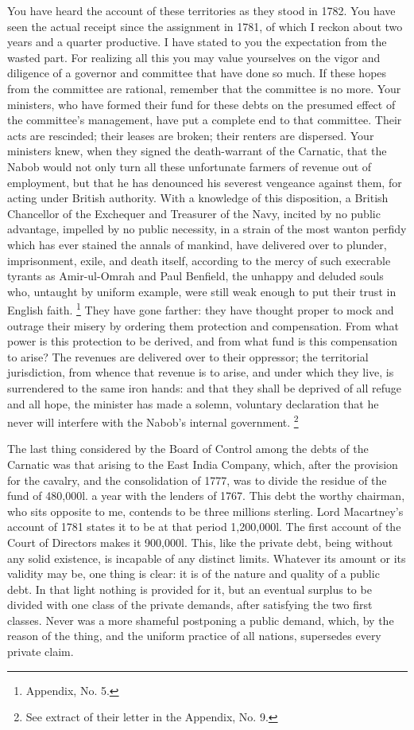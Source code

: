 You have heard the account of these territories as they stood in 1782. You have seen the actual receipt since the assignment in 1781, of which I reckon about two years and a quarter productive. I have stated to you the expectation from the wasted part. For realizing all this you may value yourselves on the vigor and diligence of a governor and committee that have done so much. If these hopes from the committee are rational, remember that the committee is no more. Your ministers, who have formed their fund for these debts on the presumed effect of the committee's management, have put a complete end to that committee. Their acts are rescinded; their leases are broken; their renters are dispersed. Your ministers knew, when they signed the death-warrant of the Carnatic, that the Nabob would not only turn all these unfortunate farmers of revenue out of employment, but that he has denounced his severest vengeance against them, for acting under British authority. With a knowledge of this disposition, a British Chancellor of the Exchequer and Treasurer of the Navy, incited by no public advantage, impelled by no public necessity, in a strain of the most wanton perfidy which has ever stained the annals of mankind, have delivered over to plunder, imprisonment, exile, and death itself, according to the mercy of such execrable tyrants as Amir-ul-Omrah and Paul Benfield, the unhappy and deluded souls who, untaught by uniform example, were still weak enough to put their trust in English faith.
\footnote{ Appendix, No. 5.}
 They have gone farther: they have thought proper to mock and outrage their misery by ordering them protection and compensation. From what power is this protection to be derived, and from what fund is this compensation to arise? The revenues are delivered over to their oppressor; the territorial jurisdiction, from whence that revenue is to arise, and under which they live, is surrendered to the same iron hands: and that they shall be deprived of all refuge and all hope, the minister has made a solemn, voluntary declaration that he never will interfere with the Nabob's internal government.
\footnote{ See extract of their letter in the Appendix, No. 9.}


The last thing considered by the Board of Control among the debts of the Carnatic was that arising to the East India Company, which, after the provision for the cavalry, and the consolidation of 1777, was to divide the residue of the fund of 480,000l. a year with the lenders of 1767. This debt the worthy chairman, who sits opposite to me, contends to be three millions sterling. Lord Macartney's account of 1781 states it to be at that period 1,200,000l. The first account of the Court of Directors makes it 900,000l. This, like the private debt, being without any solid existence, is incapable of any distinct limits. Whatever its amount or its validity may be, one thing is clear: it is of the nature and quality of a public debt. In that light nothing is provided for it, but an eventual surplus to be divided with one class of the private demands, after satisfying the two first classes. Never was a more shameful postponing a public demand, which, by the reason of the thing, and the uniform practice of all nations, supersedes every private claim.

